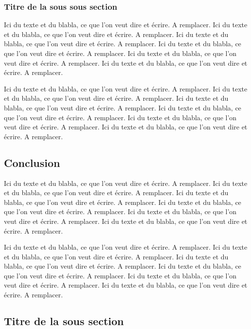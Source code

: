 \subsubsection{Titre de la sous sous section}

Ici du texte et du blabla, ce que l'on veut dire et écrire. A remplacer. Ici du texte et du blabla, ce que l'on veut dire et écrire. A remplacer. Ici du texte et du blabla, ce que l'on veut dire et écrire. A remplacer. Ici du texte et du blabla, ce que l'on veut dire et écrire. A remplacer. Ici du texte et du blabla, ce que l'on veut dire et écrire. A remplacer. Ici du texte et du blabla, ce que l'on veut dire et écrire. A remplacer.

Ici du texte et du blabla, ce que l'on veut dire et écrire. A remplacer. Ici du texte et du blabla, ce que l'on veut dire et écrire. A remplacer. Ici du texte et du blabla, ce que l'on veut dire et écrire. A remplacer. Ici du texte et du blabla, ce que l'on veut dire et écrire. A remplacer. Ici du texte et du blabla, ce que l'on veut dire et écrire. A remplacer. Ici du texte et du blabla, ce que l'on veut dire et écrire. A remplacer.

\subsection{Conclusion}

Ici du texte et du blabla, ce que l'on veut dire et écrire. A remplacer. Ici du texte et du blabla, ce que l'on veut dire et écrire. A remplacer. Ici du texte et du blabla, ce que l'on veut dire et écrire. A remplacer. Ici du texte et du blabla, ce que l'on veut dire et écrire. A remplacer. Ici du texte et du blabla, ce que l'on veut dire et écrire. A remplacer. Ici du texte et du blabla, ce que l'on veut dire et écrire. A remplacer.

Ici du texte et du blabla, ce que l'on veut dire et écrire. A remplacer. Ici du texte et du blabla, ce que l'on veut dire et écrire. A remplacer. Ici du texte et du blabla, ce que l'on veut dire et écrire. A remplacer. Ici du texte et du blabla, ce que l'on veut dire et écrire. A remplacer. Ici du texte et du blabla, ce que l'on veut dire et écrire. A remplacer. Ici du texte et du blabla, ce que l'on veut dire et écrire. A remplacer.

\subsection{Titre de la sous section}

